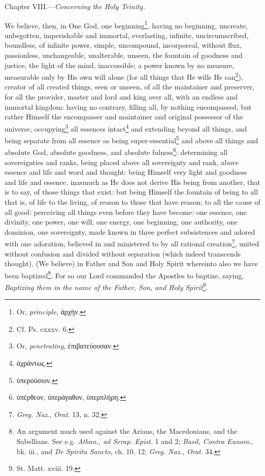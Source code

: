 
Chapter VIII.—\emph{Concerning the Holy Trinity.}

We believe, then, in One God, one beginning\footnote{Or, \emph{principle}, \textgreek{ἀρχήν}.}, having no beginning, uncreate, unbegotten, imperishable and immortal, everlasting, infinite, uncircumscribed, boundless, of infinite power, simple, uncompound, incorporeal, without flux, passionless, unchangeable, unalterable, unseen, the fountain of goodness and justice, the light of the mind, inaccessible; a power known by no measure, measurable only by His own will alone (for all things that He wills He can\footnote{Cf. Ps. cxxxv. 6.}), creator of all created things, seen or unseen, of all the maintainer and preserver, for all the provider, master and lord and king over all, with an endless and immortal kingdom: having no contrary, filling all, by nothing encompassed, but rather Himself the encompasser and maintainer and original possessor of the universe, occupying\footnote{Or, \emph{penetrating}, \textgreek{ἐπιβατεύουσαν}.} all essences intact\footnote{\textgreek{ἀχράντως}.} and extending beyond all things, and being separate from all essence as being super-essential\footnote{\textgreek{ὑπερούσιον}.} and above all things and absolute God, absolute goodness, and absolute fulness\footnote{\textgreek{ὑπέρθεον, ὑπεράγαθον, ὑπερπλήρη}.}: determining all sovereignties and ranks, being placed above all sovereignty and rank, above essence and life and word and thought: being Himself very light and goodness and life and essence, inasmuch as He does not derive His being from another, that is to say, of those things that exist: but being Himself the fountain of being to all that is, of life to the living, of reason to those that have reason; to all the cause of all good: perceiving all things even before they have become: one essence, one divinity, one power, one will, one energy, one beginning, one authority, one dominion, one sovereignty, made known in three perfect subsistences and adored with one adoration, believed in and ministered to by all rational creation\footnote{\emph{Greg. Naz}., \emph{Orat}. 13, n. 32.}, united without confusion and divided without separation (which indeed transcends thought). (We believe) in Father and Son and Holy Spirit whereinto also we have been baptized\footnote{An argument much used against the Arians, the Macedonians, and the Sabellians. See e.g. \emph{Athan., ad Serap. Epist}. 1 and 2; \emph{Basil, Contra Eunom}., bk. iii., and \emph{De Spiritu Sancto}, ch. 10, 12; \emph{Greg. Naz., Orat}. 34.}. For so our Lord commanded the Apostles to baptize, saying, \emph{Baptizing them in the name of the Father, Son, and Holy Spirit}\footnote{St. Matt. xviii. 19.}.

